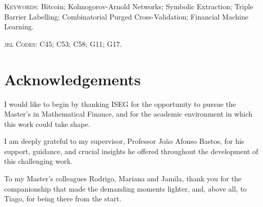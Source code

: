 \documentclass[11pt,a4paper,oneside]{article}
\begin{document}
\textsc{Keywords}: Bitcoin; Kolmogorov-Arnold Networks; Symbolic Extraction; Triple Barrier Labelling; Combinatorial Purged Cross-Validation; Financial Machine Learning.

\vspace{1em}

\textsc{\gls{jel} Codes}: C45; C53; C58; G11; G17.


\newpage
\thispagestyle{plain}
\renewcommand*\contentsname{\hfill\normalfont\scshape\normalsize Table of Contents \hfill}
\tableofcontents

\newpage
\thispagestyle{plain}
\renewcommand*\listfigurename{\hfill\normalfont\scshape\normalsize List of Figures \hfill}
\begingroup
\footnotesize
\listoffigures
\endgroup

\vspace{3em}

\renewcommand*\listtablename{\hfill\normalfont\scshape\normalsize List of Tables \hfill}
\begingroup
\footnotesize
\listoftables
\endgroup



\newpage
\thispagestyle{plain}
\section*{Acknowledgements}

I would like to begin by thanking ISEG for the opportunity to pursue the Master's in Mathematical Finance, and for the academic environment in which this work could take shape.

I am deeply grateful to my supervisor, Professor João Afonso Bastos, for his support, guidance, and crucial insights he offered throughout the development of this challenging work.

To my Master's colleagues Rodrigo, Mariana and Jamila, thank you for the companionship that made the demanding moments lighter, and, above all, to Tiago, for being there from the start.
\end{document}
